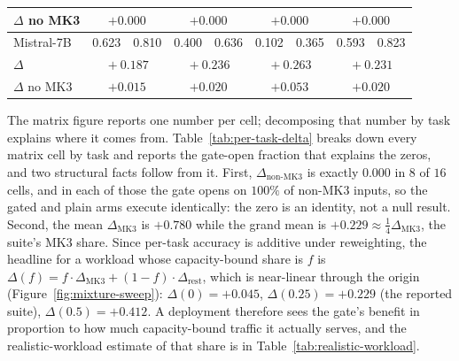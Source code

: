 \begin{table}[t]
\begin{tabular}{lcccccccc}
{\scriptsize$\Delta$ no MK3} & \multicolumn{2}{c}{\scriptsize$+0.000$} & \multicolumn{2}{c}{\scriptsize$+0.000$} & \multicolumn{2}{c}{\scriptsize$+0.000$} & \multicolumn{2}{c}{\scriptsize$+0.000$} \\
\midrule
Mistral-7B    & 0.623 & 0.810 & 0.400 & 0.636 & 0.102 & 0.365 & 0.593 & 0.823 \\
$\Delta$      & \multicolumn{2}{c}{$\!+\!0.187$} & \multicolumn{2}{c}{$\!+\!0.236$} & \multicolumn{2}{c}{$\!+\!0.263$} & \multicolumn{2}{c}{$\!+\!0.231$} \\
{\scriptsize$\Delta$ no MK3} & \multicolumn{2}{c}{\scriptsize$+0.015$} & \multicolumn{2}{c}{\scriptsize$+0.020$} & \multicolumn{2}{c}{\scriptsize$+0.053$} & \multicolumn{2}{c}{\scriptsize$+0.020$} \\
\bottomrule
\end{tabular}
\end{table}



\label{subsec:per-task-delta}

The matrix figure reports one number per cell; decomposing that number by
task explains where it comes from. Table~\ref{tab:per-task-delta} breaks
down every matrix cell by task and reports the gate-open fraction that
explains the zeros, and two structural facts follow from it. First,
$\Delta_{\text{non-MK3}}$ is exactly $0.000$ in $8$ of $16$ cells, and in
each of those the gate opens on $100\%$ of non-MK3 inputs, so the gated
and plain arms execute identically: the zero is an identity, not a null
result. Second, the mean $\Delta_{\mathrm{MK3}}$ is $+0.780$ while the
grand mean is $+0.229 \approx \tfrac{1}{4}\Delta_{\mathrm{MK3}}$, the
suite's MK3 share. Since per-task accuracy is additive under reweighting,
the headline for a workload whose capacity-bound share is $f$ is
$\Delta(f) = f \cdot \Delta_{\mathrm{MK3}} + (1 - f) \cdot
\Delta_{\text{rest}}$, which is near-linear through the origin
(Figure~\ref{fig:mixture-sweep}): $\Delta(0) = +0.045$, $\Delta(0.25) =
+0.229$ (the reported suite), $\Delta(0.5) = +0.412$. A deployment
therefore sees the gate's benefit in proportion to how much
capacity-bound traffic it actually serves, and the realistic-workload
estimate of that share is in Table~\ref{tab:realistic-workload}.

